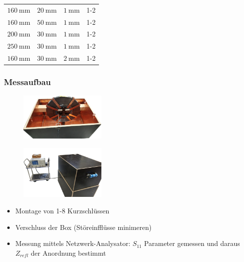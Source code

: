 \documentclass[accentcolor=tud9b, colorbacktitle, inverttitle]{tudbeamer}
\begin{document}
\begin{frame}
\begin{minipage}[t]{0.6\textwidth}
{\begin{tabular}{ | l | l |  l | l | }
		$\SI{160}{\milli\meter}$ & $\SI{20}{\milli\meter}$ & $\SI{1}{\milli\meter}$ & 1-2 \\
		$\SI{160}{\milli\meter}$ & $\SI{50}{\milli\meter}$ & $\SI{1}{\milli\meter}$ & 1-2 \\
		$\SI{200}{\milli\meter}$ & $\SI{30}{\milli\meter}$ & $\SI{1}{\milli\meter}$ & 1-2 \\
		$\SI{250}{\milli\meter}$ & $\SI{30}{\milli\meter}$ & $\SI{1}{\milli\meter}$ & 1-2 \\
		$\SI{160}{\milli\meter}$ & $\SI{30}{\milli\meter}$ & $\SI{2}{\milli\meter}$ & 1-2 \\ \hline
	\end{tabular}}
\end{minipage}
	\vfill\null
\end{frame}





\begin{frame}\frametitle{Messaufbau}
\vspace{-1em}
\begin{multicols}{2}
	\begin{figure}[h]
		\centering
		\includegraphics[width=0.38\textwidth]{BoxKreuzPolygonRK8Ks}
	\end{figure}
	\begin{figure}[h]
		\centering
		\includegraphics[width=0.38\textwidth]{messstand}
	\end{figure}
	\vfill\null
	\columnbreak
	\begin{itemize}
		\item Montage von 1-8 Kurzschl\"ussen
		\item Verschluss der Box (St\"oreinffl\"usse minimeren)
		\item Messung mittels Netzwerk-Analysator: $S_{11}$ Parameter gemessen und daraus $Z_{refl}$ der Anordnung bestimmt
	\end{itemize}
\end{multicols}
\end{frame}
\end{document}
